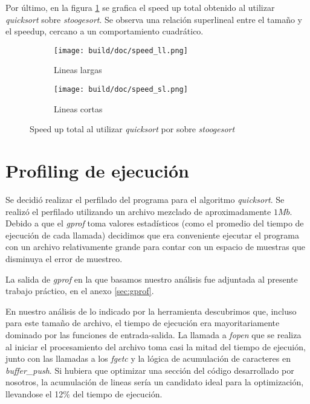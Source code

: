 \documentclass[a4paper,11pt]{article}
\begin{document}
Por último, en la figura \ref{fig:speedup} se grafica el speed up total
obtenido al utilizar \textit{quicksort} sobre \textit{stoogesort}. Se observa
una relación superlineal entre el tamaño y el speedup, cercano a un
comportamiento cuadrático.

\begin{figure}
  \begin{subfigure}[b]{\textwidth}
    \centering
    \texttt{[image: build/doc/speed\_ll.png]}
    \caption{Lineas largas}
  \end{subfigure}%

  \begin{subfigure}[b]{\textwidth}
    \centering
    \texttt{[image: build/doc/speed\_sl.png]}
    \caption{Lineas cortas}
  \end{subfigure}
  \caption{Speed up total al utilizar \textit{quicksort} por sobre \textit{stoogesort}}\label{fig:speedup}
\end{figure}

\FloatBarrier

\section{Profiling de ejecución}

Se decidió realizar el perfilado del programa para el algoritmo
\textit{quicksort}. Se realizó el perfilado utilizando un archivo mezclado de
aproximadamente \(1Mb\). Debido a que el \textit{gprof} toma valores
estadísticos (como el promedio del tiempo de ejecución de cada llamada)
decidimos que era conveniente ejecutar el programa con un archivo relativamente
grande para contar con un espacio de muestras que disminuya el error de
muestreo.

La salida de \textit{gprof} en la que basamos nuestro análisis fue adjuntada al
presente trabajo práctico, en el anexo \ref{sec:gprof}.

En nuestro análisis de lo indicado por la herramienta descubrimos que, incluso
para este tamaño de archivo, el tiempo de ejecución era mayoritariamente
dominado por las funciones de entrada-salida. La llamada a \textit{fopen} que
se realiza al iniciar el procesamiento del archivo toma casi la mitad del
tiempo de ejecuión, junto con las llamadas a los \textit{fgetc} y la lógica de
acumulación de caracteres en \textit{buffer\_push}. Si hubiera que optimizar una
sección del código desarrollado por nosotros, la acumulación de lineas sería un
candidato ideal para la optimización, llevandose el 12\% del tiempo de
ejecución.
\end{document}
